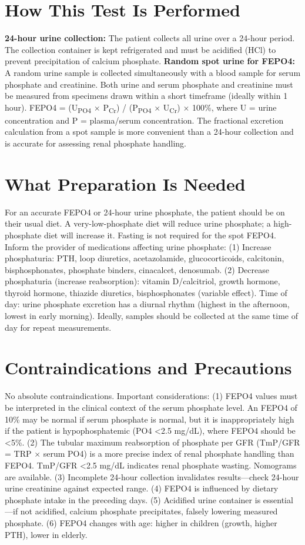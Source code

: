 \section*{How This Test Is Performed}
\textbf{24-hour urine collection:} The patient collects all urine over a 24-hour period. The collection container is kept refrigerated and must be acidified (HCl) to prevent precipitation of calcium phosphate. \textbf{Random spot urine for FEPO4:} A random urine sample is collected simultaneously with a blood sample for serum phosphate and creatinine. Both urine and serum phosphate and creatinine must be measured from specimens drawn within a short timeframe (ideally within 1 hour). FEPO4 = (U\textsubscript{PO4} $\times$ P\textsubscript{Cr}) / (P\textsubscript{PO4} $\times$ U\textsubscript{Cr}) $\times$ 100\%, where U = urine concentration and P = plasma/serum concentration. The fractional excretion calculation from a spot sample is more convenient than a 24-hour collection and is accurate for assessing renal phosphate handling.

\section*{What Preparation Is Needed}
For an accurate FEPO4 or 24-hour urine phosphate, the patient should be on their usual diet. A very-low-phosphate diet will reduce urine phosphate; a high-phosphate diet will increase it. Fasting is not required for the spot FEPO4. Inform the provider of medications affecting urine phosphate: (1) Increase phosphaturia: PTH, loop diuretics, acetazolamide, glucocorticoids, calcitonin, bisphosphonates, phosphate binders, cinacalcet, denosumab. (2) Decrease phosphaturia (increase reabsorption): vitamin D/calcitriol, growth hormone, thyroid hormone, thiazide diuretics, bisphosphonates (variable effect). Time of day: urine phosphate excretion has a diurnal rhythm (highest in the afternoon, lowest in early morning). Ideally, samples should be collected at the same time of day for repeat measurements.

\section*{Contraindications and Precautions}
No absolute contraindications. Important considerations: (1) FEPO4 values must be interpreted in the clinical context of the serum phosphate level. An FEPO4 of 10\% may be normal if serum phosphate is normal, but it is inappropriately high if the patient is hypophosphatemic (PO4 <2.5 mg/dL), where FEPO4 should be <5\%. (2) The tubular maximum reabsorption of phosphate per GFR (TmP/GFR = TRP $\times$ serum PO4) is a more precise index of renal phosphate handling than FEPO4. TmP/GFR <2.5 mg/dL indicates renal phosphate wasting. Nomograms are available. (3) Incomplete 24-hour collection invalidates results---check 24-hour urine creatinine against expected range. (4) FEPO4 is influenced by dietary phosphate intake in the preceding days. (5) Acidified urine container is essential---if not acidified, calcium phosphate precipitates, falsely lowering measured phosphate. (6) FEPO4 changes with age: higher in children (growth, higher PTH), lower in elderly.


